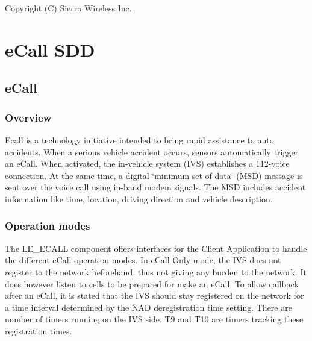 Copyright (C) Sierra Wireless Inc. \hypertarget{c_SDD_eCall}{}\section{e\+Call S\+DD}\label{c_SDD_eCall}
\hypertarget{c_SDD_eCall_eCall}{}\subsection{e\+Call}\label{c_SDD_eCall_eCall}
\hypertarget{c_SDD_mdc_Overview}{}\subsubsection{Overview}\label{c_SDD_mdc_Overview}
Ecall is a technology initiative intended to bring rapid assistance to auto accidents. When a serious vehicle accident occurs, sensors automatically trigger an e\+Call. When activated, the in-\/vehicle system (I\+VS) establishes a 112-\/voice connection. At the same time, a digital \char`\"{}minimum set of data\char`\"{} (M\+SD) message is sent over the voice call using in-\/band modem signals. The M\+SD includes accident information like time, location, driving direction and vehicle description.\hypertarget{c_SDD_eCall_le_ecall_operation}{}\subsubsection{Operation modes}\label{c_SDD_eCall_le_ecall_operation}
The L\+E\+\_\+\+E\+C\+A\+LL component offers interfaces for the Client Application to handle the different e\+Call operation modes. In e\+Call Only mode, the I\+VS does not register to the network beforehand, thus not giving any burden to the network. It does however listen to cells to be prepared for make an e\+Call. To allow callback after an e\+Call, it is stated that the I\+VS should stay registered on the network for a time interval determined by the N\+AD deregistration time setting. There are number of timers running on the I\+VS side. T9 and T10 are timers tracking these registration times.

